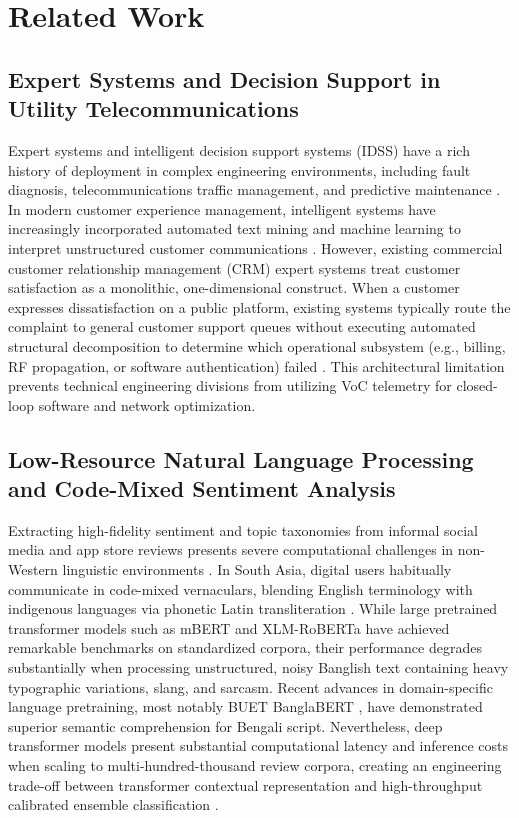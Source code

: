 \documentclass[review,12pt,authoryear]{elsarticle}
\begin{document}
\section{Related Work}
\label{sec:related_work}

\subsection{Expert Systems and Decision Support in Utility Telecommunications}
Expert systems and intelligent decision support systems (IDSS) have a rich history of deployment in complex engineering environments, including fault diagnosis, telecommunications traffic management, and predictive maintenance \citep{liao2005expert}. In modern customer experience management, intelligent systems have increasingly incorporated automated text mining and machine learning to interpret unstructured customer communications \citep{cambria2017senticnet, zhang2018deep}. However, existing commercial customer relationship management (CRM) expert systems treat customer satisfaction as a monolithic, one-dimensional construct. When a customer expresses dissatisfaction on a public platform, existing systems typically route the complaint to general customer support queues without executing automated structural decomposition to determine which operational subsystem (e.g., billing, RF propagation, or software authentication) failed \citep{parasuraman2005esqual, meuter2000self}. This architectural limitation prevents technical engineering divisions from utilizing VoC telemetry for closed-loop software and network optimization.

\subsection{Low-Resource Natural Language Processing and Code-Mixed Sentiment Analysis}
Extracting high-fidelity sentiment and topic taxonomies from informal social media and app store reviews presents severe computational challenges in non-Western linguistic environments \citep{pang2008opinion}. In South Asia, digital users habitually communicate in code-mixed vernaculars, blending English terminology with indigenous languages via phonetic Latin transliteration \citep{rahman2021deep, sazzed2021cross}. While large pretrained transformer models such as mBERT and XLM-RoBERTa \citep{devlin2019bert} have achieved remarkable benchmarks on standardized corpora, their performance degrades substantially when processing unstructured, noisy Banglish text containing heavy typographic variations, slang, and sarcasm. Recent advances in domain-specific language pretraining, most notably BUET BanglaBERT \citep{bhattacharjee2022banglabert}, have demonstrated superior semantic comprehension for Bengali script. Nevertheless, deep transformer models present substantial computational latency and inference costs when scaling to multi-hundred-thousand review corpora, creating an engineering trade-off between transformer contextual representation and high-throughput calibrated ensemble classification \citep{kuncheva2004combining}.
\end{document}
